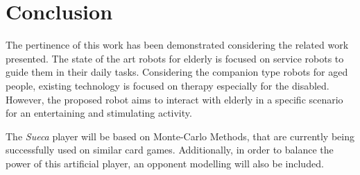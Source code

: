 \section{Conclusion} \label{sec:conclusion}

The pertinence of this work has been demonstrated considering the related work presented.
The state of the art robots for elderly is focused on service robots to guide them in their daily tasks.
Considering the companion type robots for aged people, existing technology is focused on therapy especially for the disabled.
However, the proposed robot aims to interact with elderly in a specific scenario for an entertaining and stimulating activity.

The \emph{Sueca} player will be based on Monte-Carlo Methods, that are currently being successfully used on similar card games.
Additionally, in order to balance the power of this artificial player, an opponent modelling will also be included.



